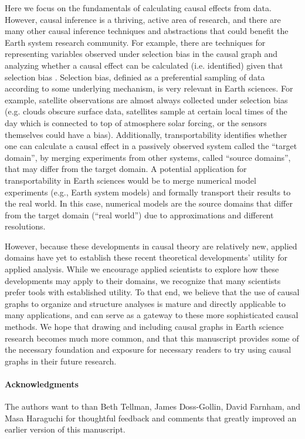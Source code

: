 \documentclass[12pt]{article}
\begin{document}
Here we focus on the fundamentals of calculating causal effects from
data. However, causal inference is a thriving, active area of
research, and there are many other causal inference techniques and
abstractions that could benefit the Earth system research
community. For example, there are techniques for representing
variables observed under selection bias in the causal graph and
analyzing whether a causal effect can be calculated (i.e. identified)
given that selection bias
\citep[e.g.,][]{bareinboim2014recovering,correa2018generalized}. Selection
bias, definied as a preferential sampling of data according to some
underlying mechanism, is very relevant in Earth sciences. For example,
satellite observations are almost always collected under selection
bias (e.g. clouds obscure surface data, satellites sample at certain
local times of the day which is connected to top of atmosphere solar
forcing, or the sensors themselves could have a bias). Additionally,
transportability
\citep[e.g.,][]{bareinboim2012transportability,Bareinboim7345,lee2019general}
identifies whether one can calculate a causal effect in a passively
observed system called the ``target domain'', by merging experiments
from other systems, called ``source domains'', that may differ from
the target domain. A potential application for transportability in
Earth sciences would be to merge numerical model experiments (e.g.,
Earth system models) and formally transport their results to the real
world. In this case, numerical models are the source domains that
differ from the target domain (``real world'') due to approximations
and different resolutions.

However, because these developments in causal theory are relatively
new, applied domains have yet to establish these recent theoretical
developments' utility for applied analysis. While we encourage applied
scientists to explore how these developments may apply to their
domains, we recognize that many scientists prefer tools with
established utility. To that end, we believe that the use of causal
graphs to organize and structure analyses is mature and directly
applicable to many applications, and can serve as a gateway to these
more sophisticated causal methods. We hope that drawing and including
causal graphs in Earth science research becomes much more common, and
that this manuscript provides some of the necessary foundation and
exposure for necessary readers to try using causal graphs in their
future research.

\paragraph{Acknowledgments} The authors want to than Beth Tellman,
James Doss-Gollin, David Farnham, and Masa Haraguchi for thoughtful
feedback and comments that greatly improved an earlier version of this
manuscript.
\end{document}
